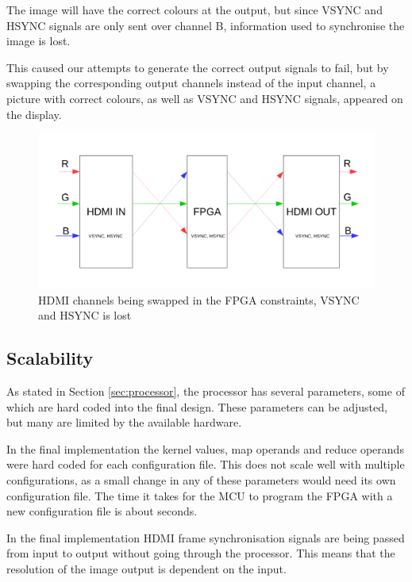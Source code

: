 The image will have the correct colours at the output, but since VSYNC and HSYNC signals are only sent over channel B, information used to synchronise the image is lost.

This caused our attempts to generate the correct output signals to fail,
but by swapping the corresponding output channels instead of the input channel,
a picture with correct colours, as well as VSYNC and HSYNC signals, appeared on the display.

\begin{figure}[h!]
    \includegraphics[width=\linewidth]{img/hdmi_channel_path.pdf}
    \caption[HDMI channels being swapped in the FPGA constraints]{
        HDMI channels being swapped in the FPGA constraints, VSYNC and HSYNC is lost
    }
    \label{fig:hdmiChannelPath}
\end{figure}

\subsection{Scalability}
As stated in Section \ref{sec:processor}, the processor has several parameters, some of which are hard coded into the final design.
These parameters can be adjusted, but many are limited by the available hardware.

In the final implementation the kernel values, map operands and reduce operands were hard coded for each configuration file.
This does not scale well with multiple configurations, as a small change in any of these parameters would need its own configuration file.
The time it takes for the MCU to program the FPGA with a new configuration file is about \unit[3]{seconds}.

In the final implementation HDMI frame synchronisation signals are being passed from input to output without going through the processor.
This means that the resolution of the image output is dependent on the input.


